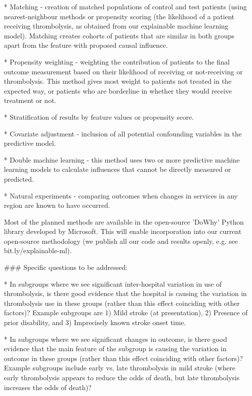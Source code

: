 \begin{markdown}
    * Matching - creation of matched populations of control and test patients (using nearest-neighbour methods or propensity scoring (the likelihood of a patient receiving thrombolysis, as obtained from our explainable machine learning model). Matching creates cohorts of patients that are similar in both groups apart from the feature with proposed causal influence.
    
    * Propensity weighting - weighting the contribution of patients to the final outcome measurement based on their likelihood of receiving or not-receiving or thrombolysis. This method gives most weight to patients not treated in the expected way, or patients who are borderline in whether they would receive treatment or not.

    * Stratification of results by feature values or propensity score.
    
    * Covariate adjustment - inclusion of all potential confounding variables in the predictive model.
       
    * Double machine learning - this method uses two or more predictive machine learning models to calculate influences that cannot be directly measured or predicted.

    * Natural experiments - comparing outcomes when changes in services in any region are known to have occurred.

Most of the planned methods are available in the open-source 'DoWhy' Python library developed by Microsoft. This will enable incorporation into our current open-source methodology (we publish all our code and results openly, e.g. see bit.ly/explainable-ml).
 
### Specific questions to be addressed:

* In subgroups where we see significant inter-hospital variation in use of thrombolysis, is there good evidence that the hospital is causing the variation in thrombolysis use in these groups (rather than this effect coinciding with other factors)? Example subgroups are 1) Mild stroke (at presentation), 2) Presence of prior disability, and 3) Imprecisely known stroke onset time.

* In subgroups where we see significant changes in outcome, is there good evidence that the main feature of the subgroup is causing the variation in outcome in these groups (rather than this effect coinciding with other factors)? Example subgroups include early vs. late thrombolysis in mild stroke (where early thrombolysis appears to reduce the odds of death, but late thrombolysis increases the odds of death)?


\end{markdown}
